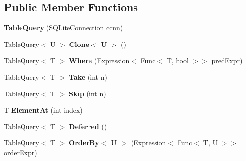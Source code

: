 \subsection*{Public Member Functions}
\begin{DoxyCompactItemize}
\item 
\hypertarget{classSQLite_1_1TableQuery_3_01T_01_4_a2e3874f45af10a8c44db821c7a848aab}{{\bfseries Table\-Query} (\hyperlink{classSQLite_1_1SQLiteConnection}{S\-Q\-Lite\-Connection} conn)}\label{classSQLite_1_1TableQuery_3_01T_01_4_a2e3874f45af10a8c44db821c7a848aab}

\item 
\hypertarget{classSQLite_1_1TableQuery_3_01T_01_4_a744de6c9fda8bf39de015ae41c0b2cb3}{Table\-Query$<$ U $>$ {\bfseries Clone$<$ U $>$} ()}\label{classSQLite_1_1TableQuery_3_01T_01_4_a744de6c9fda8bf39de015ae41c0b2cb3}

\item 
\hypertarget{classSQLite_1_1TableQuery_3_01T_01_4_aafcda8a0d85fc7708bc29cc1ae254be5}{Table\-Query$<$ T $>$ {\bfseries Where} (Expression$<$ Func$<$ T, bool $>$$>$ pred\-Expr)}\label{classSQLite_1_1TableQuery_3_01T_01_4_aafcda8a0d85fc7708bc29cc1ae254be5}

\item 
\hypertarget{classSQLite_1_1TableQuery_3_01T_01_4_abc1454c5581e01ee57873a8c59101d5c}{Table\-Query$<$ T $>$ {\bfseries Take} (int n)}\label{classSQLite_1_1TableQuery_3_01T_01_4_abc1454c5581e01ee57873a8c59101d5c}

\item 
\hypertarget{classSQLite_1_1TableQuery_3_01T_01_4_a4bf49d4c603ea8a6db6d65e51bdd6458}{Table\-Query$<$ T $>$ {\bfseries Skip} (int n)}\label{classSQLite_1_1TableQuery_3_01T_01_4_a4bf49d4c603ea8a6db6d65e51bdd6458}

\item 
\hypertarget{classSQLite_1_1TableQuery_3_01T_01_4_a1adf19dc2456239c4b4a900995b2794d}{T {\bfseries Element\-At} (int index)}\label{classSQLite_1_1TableQuery_3_01T_01_4_a1adf19dc2456239c4b4a900995b2794d}

\item 
\hypertarget{classSQLite_1_1TableQuery_3_01T_01_4_a158964fb1e56e6679ab94cf101dcc6b3}{Table\-Query$<$ T $>$ {\bfseries Deferred} ()}\label{classSQLite_1_1TableQuery_3_01T_01_4_a158964fb1e56e6679ab94cf101dcc6b3}

\item 
\hypertarget{classSQLite_1_1TableQuery_3_01T_01_4_ae35684d62851a521aac3419af0c565fb}{Table\-Query$<$ T $>$ {\bfseries Order\-By$<$ U $>$} (Expression$<$ Func$<$ T, U $>$$>$ order\-Expr)}\label{classSQLite_1_1TableQuery_3_01T_01_4_ae35684d62851a521aac3419af0c565fb}


\end{DoxyCompactItemize}
